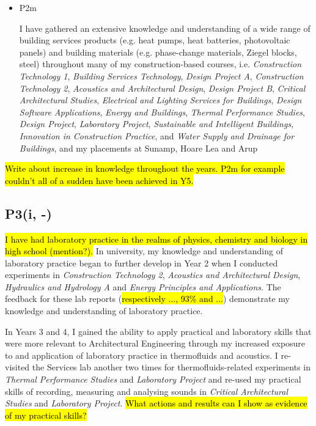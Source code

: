 \begin{itemize}
    \item P2m
    
    I have gathered an extensive knowledge and understanding of a wide range of building services products (e.g. heat pumps, heat batteries, photovoltaic panels) and building materials (e.g. phase-change materials, Ziegel blocks, steel)
    throughout many of my construction-based courses, i.e. 
    \textit{Construction Technology 1},
    \textit{Building Services Technology},
    \textit{Design Project A},
    \textit{Construction Technology 2},
    \textit{Acoustics and Architectural Design},
    \textit{Design Project B},
    \textit{Critical Architectural Studies},
    \textit{Electrical and Lighting Services for Buildings},
    \textit{Design Software Applications},
    \textit{Energy and Buildings},
    \textit{Thermal Performance Studies},
    \textit{Design Project},
    \textit{Laboratory Project},
    \textit{Sustainable and Intelligent Buildings},
    \textit{Innovation in Construction Practice},
    and \textit{Water Supply and Drainage for Buildings},
    and my placements at Sunamp, Hoare Lea and Arup
\end{itemize}
\hl{Write about increase in knowledge throughout the years. P2m for example couldn't all of a sudden have been achieved in Y5.}




\subsection*{P3(i, -)}

\hl{I have had laboratory practice in the realms of physics, chemistry and biology in high school (mention?).}
In university, my knowledge and understanding of laboratory practice began to further develop in Year 2 when I conducted experiments in \textit{Construction Technology 2}, \textit{Acoustics and Architectural Design}, \textit{Hydraulics and Hydrology A} and \textit{Energy Principles and Applications}.
The feedback for these lab reports (\hl{respectively ..., 93\% and ...}) demonstrate my knowledge and understanding of laboratory practice.

In Years 3 and 4, I gained the ability to apply practical and laboratory skills that were more relevant to Architectural Engineering through my increased exposure to and application of laboratory practice in thermofluids and acoustics.
I re-visited the Services lab another two times for thermofluids-related experiments in \textit{Thermal Performance Studies} and \textit{Laboratory Project} and re-used my practical skills of recording, measuring and analysing sounds in \textit{Critical Architectural Studies} and \textit{Laboratory Project}.
\hl{What actions and results can I show as evidence of my practical skills?}


